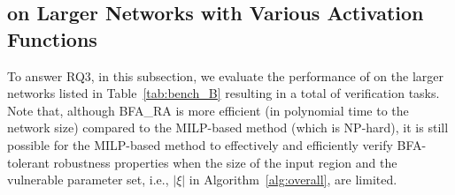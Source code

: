 \subsection{\tool on Larger Networks with Various Activation Functions}\label{sec:exp_tool_large}

To answer RQ3, in this subsection, we evaluate the performance of \tool on the larger networks listed in Table~\ref{tab:bench_B} 
resulting in a total of 
 verification tasks. Note that, although {\sf BFA\_RA} is more efficient (in polynomial time to the network size) compared to the MILP-based method (which is NP-hard), it is still possible for the MILP-based method to effectively and efficiently verify BFA-tolerant robustness properties when the size of the input region and the vulnerable parameter set, i.e., $|\xi|$ in Algorithm~\ref{alg:overall}, are limited.

\begin{table}[t]
    \centering
    \caption{}\label{tab:tool_mnist_diffAct}
    \setlength{\tabcolsep}{3pt}
\end{table} 


